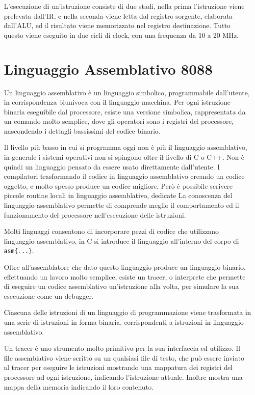 \documentclass{article}
\numberwithin{equation}{subsection}
\begin{document}
L'esecuzione di un'istruzione consiste di due stadi, nella prima l'istruzione viene prelevata dall'IR, e nella seconda viene letta dal registro sorgente, elaborata dall'ALU, ed il 
risultato viene memorizzato nel registro destinazione. Tutto questo viene eseguito in due cicli di clock, con una frequenza da 10 a 20 MHz. 

\clearpage

\section{Linguaggio Assemblativo 8088}

Un linguaggio assemblativo è un linguaggio simbolico, programmabile dall'utente, in corrispondenza biunivoca con il linguaggio macchina. Per ogni istruzione binaria eseguibile 
dal processore, esiste una versione simbolica, rappresentata da un comando molto semplice, dove gli operatori sono i registri del processore, nascondendo i dettagli bassissimi 
del codice binario. 

Il livello più basso in cui si programma oggi non è più il linguaggio assemblativo, in generale i sistemi operativi non si spingono oltre il livello di C o C++. Non è quindi un 
linguaggio pensato da essere usato direttamente dall'utente. I compilatori trasformando il codice in linguaggio assemblativo creando un codice oggetto, e molto spesso produce 
un codice migliore. Però è possibile scrivere piccole routine locali in linguaggio assemblativo, dedicate
La conoscenza del linguaggio assemblativo permette di comprende meglio il comportamento ed il funzionamento del processore nell'esecuzione delle istruzioni. 

Molti linguaggi consentono di incorporare pezzi di codice che utilizzano linguaggio assemblativo, in C si introduce il linguaggio all'interno del corpo di \verb|asm{...}|. 

Oltre all'assemblatore che dato questo linguaggio produce un linguaggio binario, effettuando un lavoro molto semplice, esiste un tracer, o interprete che permette di eseguire un 
codice assemblativo un'istruzione alla volta, per simulare la sua esecuzione come un debugger. 

Ciascuna delle istruzioni di un linguaggio di programmazione viene trasformata in una serie di istruzioni in forma binaria, corrispondenti a istruzioni in linguaggio 
assemblativo. 

Un tracer è uno strumento molto primitivo per la sua interfaccia ed utilizzo. Il file assemblativo viene scritto su un qualsiasi file di testo, che può essere inviato 
al tracer per eseguire le istruzioni mostrando una mappatura dei registri del processore ad ogni istruzione, indicando l'istruzione attuale. Inoltre mostra una mappa della 
memoria indicando il loro contenuto. 
\end{document}
